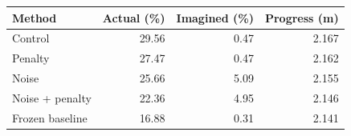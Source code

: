\begin{tabular}{lrrr}
\toprule
Method & Actual (\%) & Imagined (\%) & Progress (m) \\
\midrule
Control & 29.56 & 0.47 & 2.167 \\
Penalty & 27.47 & 0.47 & 2.162 \\
Noise & 25.66 & 5.09 & 2.155 \\
Noise + penalty & 22.36 & 4.95 & 2.146 \\
\midrule
Frozen baseline & 16.88 & 0.31 & 2.141 \\
\bottomrule
\end{tabular}
